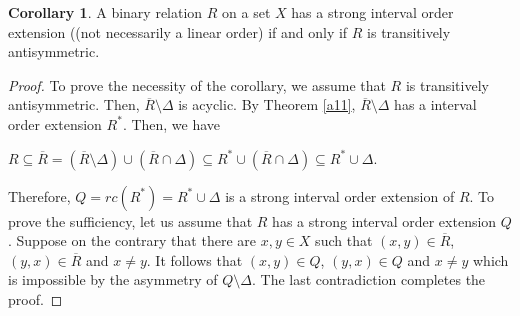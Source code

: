 \documentclass{article}
\theoremstyle{definition}
\newtheorem{corollary}[theorem]{Corollary}
\begin{document}
\begin{corollary}\label{117}{\rm A binary relation $R$ on a set $X$ has a strong interval order extension ((not necessarily a linear order)
if and only if
$R$ is transitively antisymmetric.}
\end{corollary}
\begin{proof} To prove the necessity of the corollary, we assume that $R$ is transitively antisymmetric.
Then, $\overline{R}\setminus \Delta$ is acyclic.
By Theorem \ref{a11}, $\overline{R}\setminus \Delta$ has a
interval order extension $R^{\ast}$. Then, we have
\begin{center}
$R\subseteq \overline{R}=(\overline{R}\setminus \Delta)\cup (\overline{R}\cap \Delta)\subseteq R^{\ast}\cup
(\overline{R}\cap \Delta)\subseteq R^{\ast}\cup \Delta$.
\end{center}
Therefore,
$Q=rc(R^{\ast})=
R^{\ast}\cup \Delta$ is a
strong interval order extension of $R$.
To prove the sufficiency, let us assume that $R$ has a strong interval order extension $Q$.
Suppose on the contrary that there are $x, y\in X$ such that 
$(x,y)\in \overline{R}$, $(y,x)\in \overline{R}$ and $x\neq y$. It follows that
$(x,y)\in Q$, $(y,x)\in Q$ and $x\neq y$ which
is impossible by the asymmetry of $Q\setminus \Delta$. The last contradiction completes the proof.
\end{proof}
\end{document}
